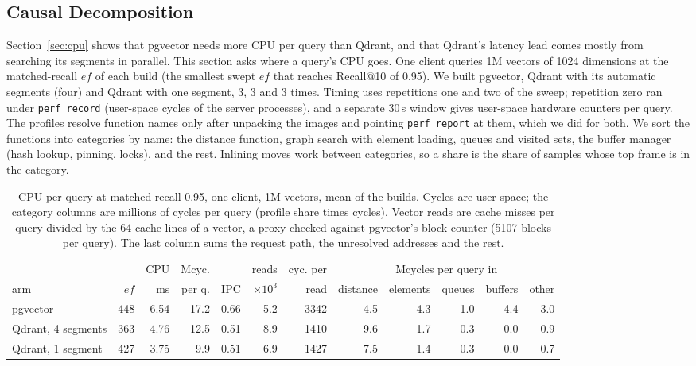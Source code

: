 \documentclass[sigconf, nonacm]{acmart}
\begin{document}
\subsection{Causal Decomposition}
\label{sec:causal}

Section~\ref{sec:cpu} shows that pgvector needs more CPU per query than Qdrant, and that Qdrant's
latency lead comes mostly from searching its segments in parallel. This section asks where a query's
CPU goes. One client queries 1M vectors of 1024 dimensions at the matched-recall $ef$ of each build (the
smallest swept $ef$ that reaches Recall@10 of 0.95). We built pgvector, Qdrant with its automatic segments
(four) and Qdrant with one segment, 3, 3 and 3 times. Timing uses repetitions one and two of the sweep; repetition
zero ran under \texttt{perf record} (user-space cycles of the server processes), and a separate
30\,s window gives user-space hardware counters per query. The profiles resolve function names only
after unpacking the images and pointing \texttt{perf report} at them, which we did for both. We sort the
functions into categories by name: the distance function, graph search with element loading, queues and
visited sets, the buffer manager (hash lookup, pinning, locks), and the rest. Inlining moves work between
categories, so a share is the share of samples whose top frame is in the category.

\begin{table}[t]
  \caption{CPU per query at matched recall 0.95, one client, 1M vectors, mean of the builds.
  Cycles are user-space; the category columns are millions of cycles per query (profile share times
  cycles). Vector reads are cache misses per query divided by the 64 cache lines of a vector, a proxy
  checked against pgvector's block counter (5107 blocks per query). The last column sums the request path,
  the unresolved addresses and the rest.}
  \label{tab:causal}
  \small
  \begin{tabular}{@{}lrrrrrrrrrrr@{}}
    \toprule
    & & CPU & Mcyc. & & reads & cyc. per & \multicolumn{5}{c}{Mcycles per query in} \\
    arm & $ef$ & ms & per q. & IPC & $\times10^3$ & read & distance & elements & queues & buffers & other \\
    \midrule
    pgvector & 448 & 6.54 & 17.2 & 0.66 & 5.2 & 3342 & 4.5 & 4.3 & 1.0 & 4.4 & 3.0 \\
    Qdrant, 4 segments & 363 & 4.76 & 12.5 & 0.51 & 8.9 & 1410 & 9.6 & 1.7 & 0.3 & 0.0 & 0.9 \\
    Qdrant, 1 segment & 427 & 3.75 & 9.9 & 0.51 & 6.9 & 1427 & 7.5 & 1.4 & 0.3 & 0.0 & 0.7 \\
    \bottomrule
  \end{tabular}
\end{table}
\end{document}
